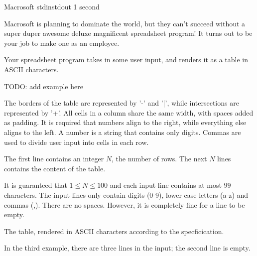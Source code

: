 \begin{problem}{Macrosoft}
{stdin}{stdout}
{1 second}{}{}

Macrosoft is planning to dominate the world, but they can't succeed without 
a super duper awesome deluxe magnificent spreadsheet program! It turns out to be your job to
make one as an employee. 

Your spreadsheet program takes in some user input, and renders it as a table in ASCII characters. 
\begin{center}
TODO: add example here
\end{center}
The borders of the table are represented by '-' and '|', while intersections are represented by '+'. All cells in a column share the same width, with spaces added as padding. It is required that numbers align to the right, while everything else aligns to the left. A number is a string that contains only digits. Commas are used to divide user input into cells in each row. 

\InputFile

The first line contains an integer $N$, the number of rows.
The next $N$ lines contains the content of the table. 

It is guaranteed that $1 \leq N \leq 100$ and each input line contains at most $99$ characters. 
The input lines only contain digits (0-9), lower case letters (a-z) and commas (,). There are no spaces. However, it is completely fine for a line to be empty.

\OutputFile

The table, rendered in ASCII characters according to the specficication.

\Examples

\begin{example}
%
%
%
\end{example}

\Notes

In the third example, there are three lines in the input; the second line is empty. 

\end{problem}
